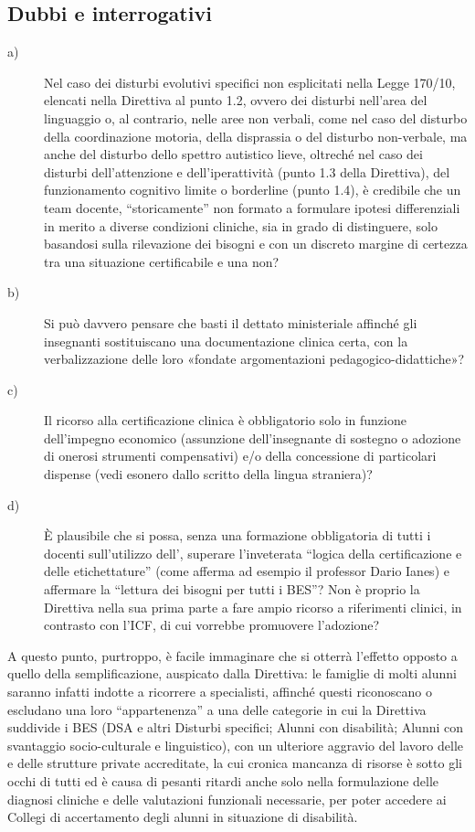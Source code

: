 \subsection*{Dubbi e interrogativi}
\begin{description}
	\item[a)] Nel caso dei disturbi evolutivi specifici non esplicitati nella Legge 170/10, elencati nella Direttiva al punto 1.2, ovvero dei disturbi nell'area del linguaggio o, al contrario, nelle aree non verbali, come nel caso del disturbo della coordinazione motoria, della disprassia o del disturbo non-verbale, ma anche del disturbo dello spettro autistico lieve, oltreché nel caso dei disturbi dell'attenzione e dell'iperattività (punto 1.3 della Direttiva), del funzionamento cognitivo limite o borderline (punto 1.4), è credibile che un team docente, “storicamente” non formato a formulare ipotesi differenziali in merito a diverse condizioni cliniche, sia in grado di distinguere, solo basandosi sulla rilevazione dei bisogni e con un discreto margine di certezza tra una situazione certificabile e una non?
	\item [b)]Si può davvero pensare che basti il dettato ministeriale affinché gli insegnanti sostituiscano una documentazione clinica certa, con la verbalizzazione delle loro «fondate argomentazioni pedagogico-didattiche»?
	\item [c)] Il ricorso alla certificazione clinica è obbligatorio solo in funzione dell'impegno economico (assunzione dell'insegnante di sostegno o adozione di onerosi strumenti compensativi) e/o della concessione di particolari dispense (vedi esonero dallo scritto della lingua straniera)?
	\item [d)] È plausibile che si possa, senza una formazione obbligatoria di tutti i docenti sull'utilizzo dell', superare l'inveterata “logica della certificazione e delle etichettature” (come afferma ad esempio il professor Dario Ianes) e affermare la “lettura dei bisogni per tutti i BES”? Non è proprio la Direttiva nella sua prima parte a fare ampio ricorso a riferimenti clinici, in contrasto con l'ICF, di cui vorrebbe promuovere l'adozione?
\end{description}
	A questo punto, purtroppo, è facile immaginare che si otterrà l'effetto opposto a quello della semplificazione, auspicato dalla Direttiva: le famiglie di molti alunni saranno infatti indotte a ricorrere a specialisti, affinché questi riconoscano o escludano una loro “appartenenza” a una delle categorie in cui la Direttiva suddivide i BES (DSA e altri Disturbi specifici; Alunni con disabilità; Alunni con svantaggio socio-culturale e linguistico), con un ulteriore aggravio del lavoro delle  e delle strutture private accreditate, la cui cronica mancanza di risorse è sotto gli occhi di tutti ed è causa di pesanti ritardi anche solo nella formulazione delle diagnosi cliniche e delle valutazioni funzionali necessarie, per poter accedere ai Collegi di accertamento degli alunni in situazione di disabilità.
